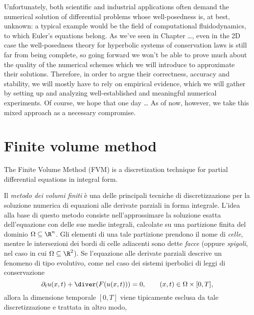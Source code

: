 Unfortunately, both scientific and industrial applications often demand
the numerical solution of differential problems whose well-posedness is,
at best, unknown: a typical example would be the field of computational
fluidodynamics, to which Euler's equations belong.
As we've seen in Chapter \dots,
even in the 2D case the well-posedness theory for hyperbolic systems
of conservation laws is still far from being complete,
so going forward
we won't be able to prove much about the quality of the numerical
schemes which we will introduce to approximate their solutions.
Therefore, in order to argue their correctness, accuracy and
stability, we will mostly have to rely on empirical evidence,
which we will gather by setting up and analyzing well-established
and meaningful numerical experiments.
Of course, we hope that one day \dots
As of now, however, we take this mixed approach as a necessary compromise.

\section{Finite volume method}

The Finite Volume Method (FVM) is a discretization technique
for partial differential equations in integral form.


















\clearpage

Il \emph{metodo dei volumi finiti} è una delle principali
tecniche di discretizzazione per la soluzione numerica di equazioni
alle derivate parziali in forma integrale.
L'idea alla base di questo metodo consiste nell'approssimare
la soluzione esatta dell'equazione con delle sue medie integrali,
calcolate su una partizione finita del dominio $\Omega \subseteq \R^n$.
Gli elementi di una tale partizione prendono il nome di \emph{celle},
mentre le intersezioni dei bordi di celle adiacenti sono dette \emph{facce}
(oppure \emph{spigoli}, nel caso in cui $\Omega \subseteq \R^2$).
Se l'equazione alle derivate parziali descrive un fenomeno di tipo
evolutivo, come nel caso dei sistemi iperbolici di leggi
di conservazione
\[
\partial_t u(x,t) + \diver(F(u(x,t))) = 0,
\qquad (x,t) \in \Omega \times [0,T],
\]
allora la dimensione temporale $[0,T]$ viene tipicamente esclusa
da tale discretizzazione e trattata in altro modo,

